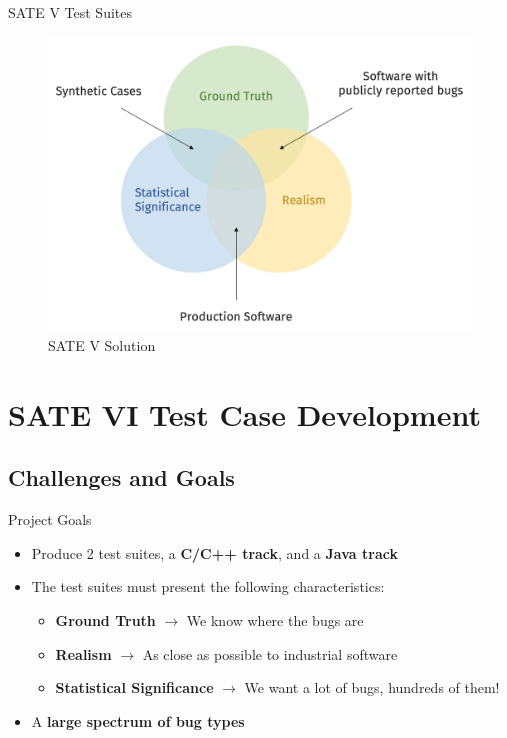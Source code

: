 \documentclass[aspectratio=169]{beamer}
\begin{document}
  \begin{frame}{SATE V Test Suites}
    \begin{figure}
      \centering
      \includegraphics[scale=0.3]{figures/sate-v-test-suites}
      \caption{SATE V Solution}
    \end{figure}
  \end{frame}
  
  \section{SATE VI Test Case Development}

  \subsection{Challenges and Goals}

  \begin{frame}{Project Goals}
    \begin{itemize}
    \setlength\itemsep{1em}
    \item Produce 2 test suites, a \textbf{C/C++ track}, and a \textbf{Java track}
    \pause
    \item The test suites must present the following characteristics:
      \vspace{0.3em}
      \begin{itemize}
      \setlength\itemsep{0.5em}
      \item \textbf{Ground Truth} $\rightarrow$ We know where the bugs are
      \item \textbf{Realism} $\rightarrow$ As close as possible to industrial software
      \item \textbf{Statistical Significance} $\rightarrow$ We want a lot of bugs, hundreds of them!
      \end{itemize}
    \pause
    \item A \textbf{large spectrum of bug types}
    \end{itemize}
  \end{frame}
\end{document}
